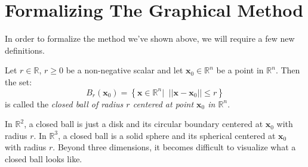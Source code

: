 \section{Formalizing The Graphical  Method}
In order to formalize the method we've shown above, we will require a few new definitions. 

\begin{definition}{}{} Let $r \in \mathbb{R}$, $r \geq 0$ be a non-negative scalar and let $\mathbf{x}_0 \in \mathbb{R}^n$ be a point in $\mathbb{R}^n$. Then the set:
\begin{equation}
B_r(\mathbf{x}_0) = \left\{\mathbf{x} \in \mathbb{R}^n | \;\; ||\mathbf{x} - \mathbf{x}_0|| \leq r\right\}
\end{equation}
is called the \textit{closed ball of radius $r$ centered at point $\mathbf{x}_0$ in $\mathbb{R}^n$}. 
\label{defn:ClosedBall}
\end{definition}
In $\mathbb{R}^2$, a closed ball is just a disk and its circular boundary centered at $\mathbf{x}_0$ with radius $r$. In $\mathbb{R}^3$, a closed ball is a solid sphere and its spherical centered at $\mathbf{x}_0$ with radius $r$. Beyond three dimensions, it becomes difficult to visualize what a closed ball looks like. 

